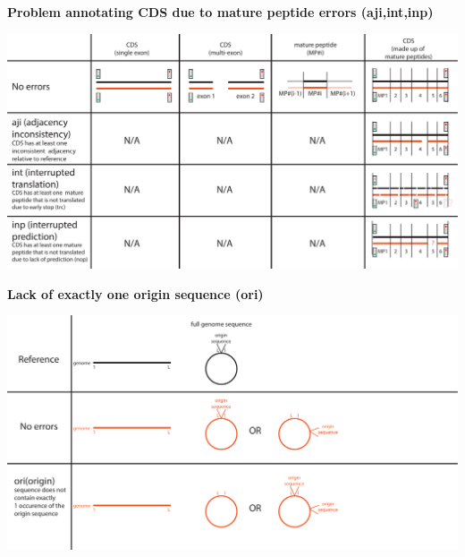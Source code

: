 \documentclass[landscape]{slides}
\begin{document}
\begin{slide}
\begin{center}
\textbf{Problem annotating CDS due to mature peptide errors (aji,int,inp)}
\vspace{0.5in}

\includegraphics[width=10in]{figs/error-8-aji-int-inp}
\end{center}
\vfill
\end{slide}
\begin{slide}
\begin{center}
\textbf{Lack of exactly one origin sequence (ori)}
\vspace{0.5in}

\includegraphics[width=10in]{figs/error-9-ori}
\end{center}
\vfill
\end{slide}
\end{document}
